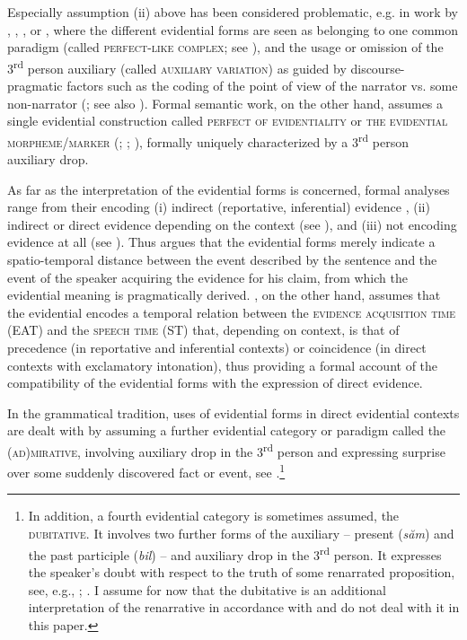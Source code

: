 \documentclass[output=paper,
colorlinks,
citecolor=brown,
newtxmath
]{langscibook}
\begin{document}
Especially assumption (ii) above has been considered problematic, e.g. in work by \citet{Gerdzikov1984}, \citet{Ivancev1988}, \citet{Levin-Steinmann2004}, or \citet{Sonnenhauser2013}, where the different evidential forms are seen as belonging to one common paradigm (called \textsc{perfect-like complex}; see \citealt{Ivancev1988}), and the usage or omission of the 3\textsuperscript{rd} person auxiliary (called \textsc{auxiliary variation}) as guided by discourse-pragmatic factors such as the coding of the point of view of the narrator vs. some non-narrator (\citealt{Sonnenhauser2013}; see also \citealt{Friedman1981,Lindstedt1994,Fielder99}). Formal semantic work, on the other hand, assumes a single evidential construction called \textsc{perfect of evidentiality} \citep{Izvorski1997} or \textsc{the evidential morpheme/marker} (\citealt{Smirnova2011a,Smirnova2011b}; \citeyear{Smirnova2013}; \citealt{Koev2017}), formally uniquely characterized by a 3\textsuperscript{rd} person auxiliary drop.


As far as the interpretation of the evidential forms is concerned, formal analyses range from their encoding (i) indirect (reportative, inferential) evidence \citep[see][]{Izvorski1997}, (ii) indirect or direct evidence depending on the context (see \citeauthor{Smirnova2013}), and (iii) not encoding evidence at all (see \citealt{Koev2017}). Thus \citeauthor{Koev2017} argues that the evidential forms merely indicate a spatio-temporal distance between the event described by the sentence and the event of the speaker acquiring the evidence for his claim, from which the evidential meaning is pragmatically derived. \citeauthor{Smirnova2013}, on the other hand, assumes that the evidential encodes a temporal relation between the \textsc{evidence acquisition time} (EAT) and the \textsc{speech time} (ST) that, depending on context, is that of precedence (in reportative and inferential contexts) or coincidence (in direct contexts with exclamatory intonation), thus providing a formal account of the compatibility of the evidential forms with the expression of direct evidence.

In the grammatical tradition, uses of evidential forms in direct evidential contexts are dealt with by assuming a further evidential category or paradigm \citep[see][]{Stankov1969} called the \textsc{(ad)mirative}, involving auxiliary drop in the 3\textsuperscript{rd} person and expressing surprise over some suddenly discovered fact or event, see .\footnote{In addition, a fourth evidential category is sometimes assumed, the \textsc{dubitative}. It involves two further forms of the auxiliary -- present (\textit{săm}) and the past participle (\textit{bil}) -- and auxiliary drop in the 3\textsuperscript{rd} person. It expresses the speaker's doubt with respect to the truth of some renarrated proposition, see, e.g., \citet{Bojadziev.etal1999}; \citet{Pasov1999}. I assume for now that the dubitative is an additional interpretation of the renarrative in accordance with \cite{Bojadziev.etal1999} and do not deal with it in this paper.}
\end{document}
